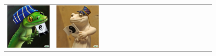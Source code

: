 \begin{figure}[ht!]
\begin{adjustwidth}{-0.8in}{-0.5in}
\begin{tabular}{cccccccccccccccccccc}
\multicolumn{2}{c}{\includegraphics[width=\threebythreecolwidth\textwidth]{figures/cherries/oil.jpg}} &
\multicolumn{2}{c}{\includegraphics[width=\threebythreecolwidth\textwidth]{figures/cherries/marble.jpg}} &

\end{tabular}
\end{adjustwidth}
\end{figure}
